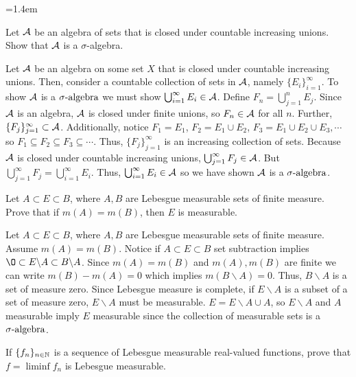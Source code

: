 \begin{list}
{}
{\leftmargin=1.4em}

\item Let ${\mathcal A}$ be an algebra of sets that is closed under countable increasing unions. Show that ${\mathcal A}$ is a $\sigma$-algebra.
\begin{pf}
Let ${\mathcal A}$ be an algebra on some set $X$ that is closed under countable increasing unions. Then, consider a countable collection of sets in ${\mathcal A}$, namely $\{E_i\}_{i=1}^\infty$. To show ${\mathcal A}$ is a ${\sigma}\text{-algebra}$ we must show $\bigcup _{i=1}^\infty E_i \in {\mathcal A}$. Define $F_n = \bigcup _{j=1}^n E_j$. Since ${\mathcal A}$ is an algebra, ${\mathcal A}$ is closed under finite unions, so $F_n \in {\mathcal A}$ for all $n$. Further, $\{F_j \}_{j=1}^\infty \subset {\mathcal A}$. Additionally, notice $F_1=E_1$, $F_2 = E_1 \cup E_2$, $F_3 = E_1 \cup E_2 \cup E_3, \cdots$ so $F_1 \subseteq F_2 \subseteq F_3 \subseteq \cdots$. Thus, $\{F_j \}_{j=1}^\infty$ is an increasing collection of sets. Because ${\mathcal A}$ is closed under countable increasing unions, $\bigcup_{j=1}^\infty F_j \in {\mathcal A}$. But $\bigcup_{j=1}^\infty F_j = \bigcup _{i=1}^\infty E_i $. Thus, $\bigcup _{i=1}^\infty E_i \in {\mathcal A}$ so we have shown ${\mathcal A}$ is a ${\sigma}\text{-algebra}$. 	
\end{pf}

\item Let $A\subset E \subset B$, where $A, B$ are Lebesgue measurable sets of finite measure. Prove that if $m(A)=m(B)$, then $E$ is measurable.
\begin{pf}
	Let $A\subset E \subset B$, where $A, B$ are Lebesgue measurable sets of finite measure. Assume $m(A)=m(B)$. Notice if $A \subset E \subset B$ set subtraction implies $\O \subset E \backslash A \subset B \backslash A$. Since $m(A)=m(B)$ and $m(A), m(B)$ are finite we can write $m(B)-m(A)=0$ which implies $m(B \backslash A) = 0$. Thus, $B \backslash A$ is a set of measure zero. Since Lebesgue measure is complete, if $E \backslash A$ is a subset of a set of measure zero, $E \backslash A$ must be measurable. $E = E\backslash A \cup A$, so $E \backslash A$ and $A$ measurable imply $E$ measurable since the collection of measurable sets is a  ${\sigma}\text{-algebra}$. 
\end{pf}


\item If $\{f_n \}_{n\in {\mathbb N}}$ is a sequence of Lebesgue measurable real-valued functions, prove that \\ $f=\liminf f_n$ is Lebesgue measurable. 
\begin{pf}
	

\end{pf}
\end{list}
